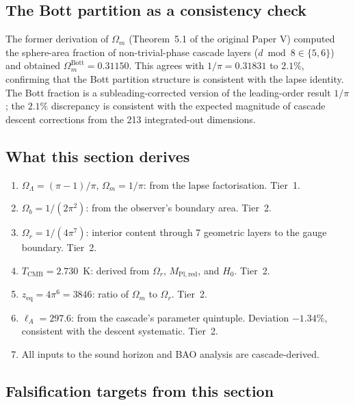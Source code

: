 \documentclass[12pt,a4paper]{article}
\theoremstyle{remark}
\begin{document}
\subsection{The Bott partition as a consistency check}

The former derivation of $\Omega_m$ (Theorem~5.1 of the original Paper V) computed the sphere-area fraction of non-trivial-phase cascade layers ($d \bmod 8 \in \{5, 6\}$) and obtained $\Omega_m^{\mathrm{Bott}} = 0.31150$. This agrees with $1/\pi = 0.31831$ to $2.1\%$, confirming that the Bott partition structure is consistent with the lapse identity. The Bott fraction is a subleading-corrected version of the leading-order result $1/\pi$; the $2.1\%$ discrepancy is consistent with the expected magnitude of cascade descent corrections from the 213 integrated-out dimensions.

\subsection{What this section derives}

\begin{enumerate}[nosep]
\item $\Omega_\Lambda = (\pi - 1)/\pi$, $\Omega_m = 1/\pi$: from the lapse factorisation. Tier~1.
\item $\Omega_b = 1/(2\pi^2)$: from the observer's boundary area. Tier~2.
\item $\Omega_r = 1/(4\pi^7)$: interior content through 7 geometric layers to the gauge boundary. Tier~2.
\item $T_{\mathrm{CMB}} = 2.730$~K: derived from $\Omega_r$, $M_{\mathrm{Pl,red}}$, and $H_0$. Tier~2.
\item $z_{\mathrm{eq}} = 4\pi^6 = 3846$: ratio of $\Omega_m$ to $\Omega_r$. Tier~2.
\item $\ell_A = 297.6$: from the cascade's parameter quintuple. Deviation $-1.34\%$, consistent with the descent systematic. Tier~2.
\item All inputs to the sound horizon and BAO analysis are cascade-derived.
\end{enumerate}

\subsection{Falsification targets from this section}
\end{document}

